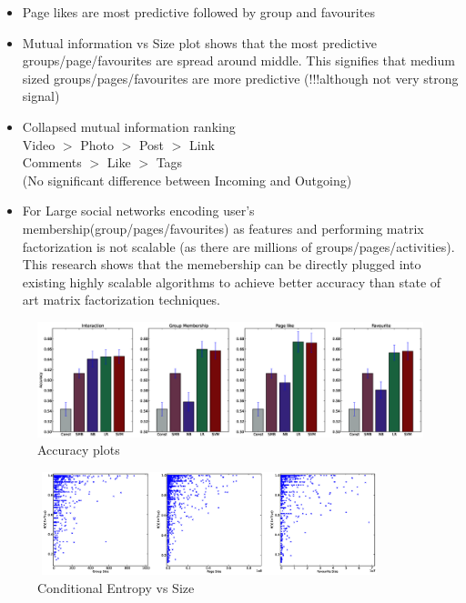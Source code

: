 \begin{itemize}
  \item Page likes are most predictive followed by group and favourites
  \item Mutual information vs Size plot shows that the most predictive groups/page/favourites are spread around middle. This signifies that medium sized groups/pages/favourites are more predictive (!!!although not very strong signal)
  \item Collapsed mutual information ranking \\Video $>$ Photo $>$ Post $>$ Link\\ Comments $>$ Like $>$ Tags\\
   (No significant difference between Incoming and Outgoing)
   \item For Large social networks encoding user's membership(group/pages/favourites) as features and performing matrix factorization is not scalable (as there are millions of groups/pages/activities). This research shows that the memebership can be directly plugged into existing highly scalable algorithms to achieve better accuracy than state of art matrix factorization techniques. 
\end{itemize}


\begin{figure}
\centering
\includegraphics[scale=0.25]{data/accuracy.eps}
\caption{Accuracy plots}
\label{Fig: Accuracy}
\end{figure}

\begin{figure}
\centering
\includegraphics[width=100mm, height=30mm]{data/CEvsSize.eps}
\caption{Conditional Entropy vs Size}
\label{Fig: Conditional Entropy vs Size}
\end{figure}


